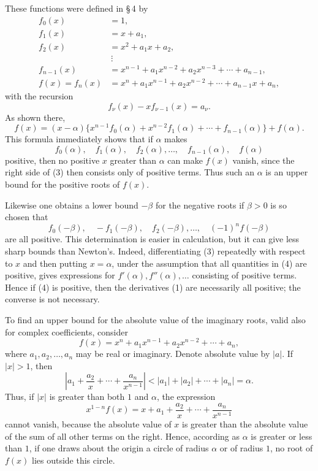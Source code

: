 \documentclass[11pt]{article}
\begin{document}
These functions were defined in \S\,4 by
\[
\begin{aligned}
f_0(x)&=1,\\
f_1(x)&=x+a_1,\\
f_2(x)&=x^2+a_1x+a_2,\\
&\ \vdots\\
f_{n-1}(x)&=x^{n-1}+a_1x^{n-2}+a_2x^{n-3}+\cdots+a_{n-1},\\
f(x)=f_n(x)&=x^n+a_1x^{n-1}+a_2x^{n-2}+\cdots+a_{n-1}x+a_n,
\end{aligned}
\]
with the recursion
\[
        f_\nu(x)-x f_{\nu-1}(x)=a_\nu.
\]
As shown there,
\begin{equation}
        f(x)=(x-\alpha)\{x^{n-1}f_0(\alpha)+x^{n-2}f_1(\alpha)+\cdots+f_{n-1}(\alpha)\}+f(\alpha).
\tag{3}
\end{equation}
This formula immediately shows that if $\alpha$ makes
\begin{equation}
        f_0(\alpha),\quad f_1(\alpha),\quad f_2(\alpha),\ldots,\quad f_{n-1}(\alpha),\quad f(\alpha)
\tag{4}
\end{equation}
positive, then no positive $x$ greater than $\alpha$ can make $f(x)$ vanish, since the right side of (3) then consists only of positive terms. Thus such an $\alpha$ is an upper bound for the positive roots of $f(x)$.

Likewise one obtains a lower bound $-\beta$ for the negative roots if $\beta>0$ is so chosen that
\begin{equation}
        f_0(-\beta),\quad -f_1(-\beta),\quad f_2(-\beta),\ldots,\quad (-1)^n f(-\beta)
\tag{5}
\end{equation}
are all positive. This determination is easier in calculation, but it can give less sharp bounds than Newton's. Indeed, differentiating (3) repeatedly with respect to $x$ and then putting $x=\alpha$, under the assumption that all quantities in (4) are positive, gives expressions for $f'(\alpha),f''(\alpha),\ldots$ consisting of positive terms. Hence if (4) is positive, then the derivatives (1) are necessarily all positive; the converse is not necessary.

To find an upper bound for the absolute value of the imaginary roots, valid also for complex coefficients, consider
\[
        f(x)=x^n+a_1x^{n-1}+a_2x^{n-2}+\cdots+a_n,
\]
where $a_1,a_2,\ldots,a_n$ may be real or imaginary. Denote absolute value by $|a|$. If $|x|>1$, then
\[
        \left|a_1+\frac{a_2}{x}+\cdots+\frac{a_n}{x^{n-1}}\right|
        < |a_1|+|a_2|+\cdots+|a_n|=\alpha.
\]
Thus, if $|x|$ is greater than both $1$ and $\alpha$, the expression
\[
        x^{1-n}f(x)=x+a_1+\frac{a_2}{x}+\cdots+\frac{a_n}{x^{n-1}}
\]
cannot vanish, because the absolute value of $x$ is greater than the absolute value of the sum of all other terms on the right. Hence, according as $\alpha$ is greater or less than $1$, if one draws about the origin a circle of radius $\alpha$ or of radius $1$, no root of $f(x)$ lies outside this circle.
\end{document}
